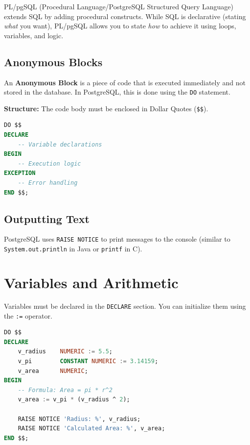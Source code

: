\documentclass[12pt,a4paper]{article}
\begin{document}
PL/pgSQL (Procedural Language/PostgreSQL Structured Query Language) extends SQL by adding procedural constructs. While SQL is declarative (stating \textit{what} you want), PL/pgSQL allows you to state \textit{how} to achieve it using loops, variables, and logic.

\subsection{Anonymous Blocks}
An \textbf{Anonymous Block} is a piece of code that is executed immediately and not stored in the database. In PostgreSQL, this is done using the \texttt{DO} statement.

\textbf{Structure:}
The code body must be enclosed in Dollar Quotes (\texttt{\$\$}).


\begin{lstlisting}[language=SQL]
DO $$ 
DECLARE
    -- Variable declarations
BEGIN
    -- Execution logic
EXCEPTION
    -- Error handling
END $$;
\end{lstlisting}

\subsection{Outputting Text}
PostgreSQL uses \texttt{RAISE NOTICE} to print messages to the console (similar to \texttt{System.out.println} in Java or \texttt{printf} in C).

\section{Variables and Arithmetic}

Variables must be declared in the \texttt{DECLARE} section. You can initialize them using the \texttt{:=} operator.

\begin{lstlisting}[language=SQL, caption={Geometry Calculation}]
DO $$ 
DECLARE
    v_radius    NUMERIC := 5.5;
    v_pi        CONSTANT NUMERIC := 3.14159;
    v_area      NUMERIC;
BEGIN
    -- Formula: Area = pi * r^2
    v_area := v_pi * (v_radius ^ 2);

    RAISE NOTICE 'Radius: %', v_radius;
    RAISE NOTICE 'Calculated Area: %', v_area; 
END $$;
\end{lstlisting}

\end{document}
